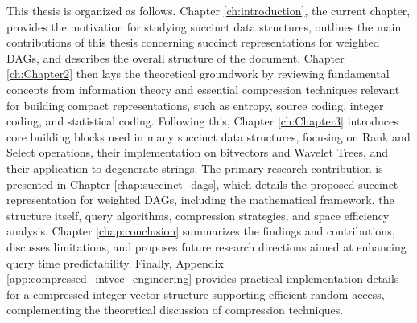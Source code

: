 This thesis is organized as follows. Chapter \ref{ch:introduction}, the current chapter, provides the motivation for studying succinct data structures, outlines the main contributions of this thesis concerning succinct representations for weighted DAGs, and describes the overall structure of the document. Chapter \ref{ch:Chapter2} then lays the theoretical groundwork by reviewing fundamental concepts from information theory and essential compression techniques relevant for building compact representations, such as entropy, source coding, integer coding, and statistical coding. Following this, Chapter \ref{ch:Chapter3} introduces core building blocks used in many succinct data structures, focusing on Rank and Select operations, their implementation on bitvectors and Wavelet Trees, and their application to degenerate strings. The primary research contribution is presented in Chapter \ref{chap:succinct_dags}, which details the proposed succinct representation for weighted DAGs, including the mathematical framework, the structure itself, query algorithms, compression strategies, and space efficiency analysis. Chapter \ref{chap:conclusion} summarizes the findings and contributions, discusses limitations, and proposes future research directions aimed at enhancing query time predictability. Finally, Appendix \ref{app:compressed_intvec_engineering} provides practical implementation details for a compressed integer vector structure supporting efficient random access, complementing the theoretical discussion of compression techniques.
